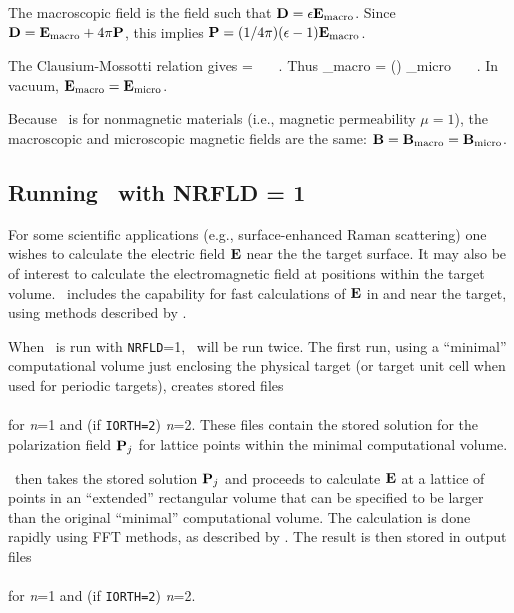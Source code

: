 The macroscopic field is the field such that 
${\bf D} = \epsilon {\bf E}_{\rm macro}$.
Since ${\bf D}={\bf E}_{\rm macro} + 4\pi{\bf P}$, this implies
${\bf P}=(1/4\pi)(\epsilon-1){\bf E}_{\rm macro}$.


The Clausium-Mossotti relation gives 
\beq
{} = 
~~~.
\eeq
Thus
\beq \label{eq:macro_vs_micro}
\bE_{\rm macro} = \left(\right) \bE_{\rm micro} ~~~.
\eeq
In vacuum, ${\bf E}_{\rm macro}={\bf E}_{\rm micro}$.

Because \ddscatseventhree\ is for nonmagnetic materials
(i.e., magnetic permeability $\mu = 1$), the macroscopic and microscopic
magnetic fields are the same: ${\bf B}={\bf B}_{\rm macro}={\bf B}_{\rm micro}$.

\subsection{Running \ddscatseventhree\ with NRFLD = 1}

For some scientific applications (e.g., surface-enhanced Raman
scattering) one wishes to calculate the electric field ${\bf E}$ near the
the target surface.  It may also be of interest to calculate the
electromagnetic field at positions within the target volume.
\ddscatv\ includes the capability for fast calculations of ${\bf E}$ in
and near the target, using methods described by
\citet{Flatau+Draine_2012}.

When \ddscat\ is run with {\tt NRFLD}=1, \ddscat\
will be run twice.
The first run, using a ``minimal'' computational volume just enclosing the
physical target (or target unit cell when used for periodic targets), 
creates stored files\\
\indent{}\\
for {\it n}=1 and (if {\tt IORTH=2}) {\it n}=2.
These files contain the stored solution for the polarization field
${\bf P}_j$ for lattice points
within the minimal computational volume.

\ddscatseventhree\ then takes the stored solution ${\bf P}_j$ and
proceeds to calculate ${\bf E}$ at a lattice of points in an ``extended'' 
rectangular volume
that can be specified to be larger than the original ``minimal'' computational
volume.  The calculation is done rapidly using FFT methods, as described
by \citet{Flatau+Draine_2012}.
The result is then stored in output files\\
\indent{}\\
for {\it n}=1 and (if {\tt IORTH=2}) {\it n}=2.

